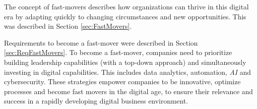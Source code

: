 \documentclass[a4]{scrartcl}
\begin{document}
	
	The concept of fast-movers describes how organizations can thrive in this digital era by adapting quickly to changing circumstances and new opportunities. This was described in Section \ref{sec:FastMovers}.
	
	Requirements to become a fast-mover were described in Section \ref{sec:ReqFastMovers}. To become a fast-mover, companies need to prioritize building leadership capabilities (with a top-down approach) and simultaneously investing in digital capabilities. This includes data analytics, automation, \textit{AI} and cybersecurity. These strategies empower companies to be innovative, optimize processes and become fast movers in the digital age, to ensure their relevance and success in a rapidly developing digital business environment.

	






	

	
	\newpage
	\begin{spacing}{0.9}
		\printbibliography
	\end{spacing}


	
	
	
	
	
	
\end{document}

